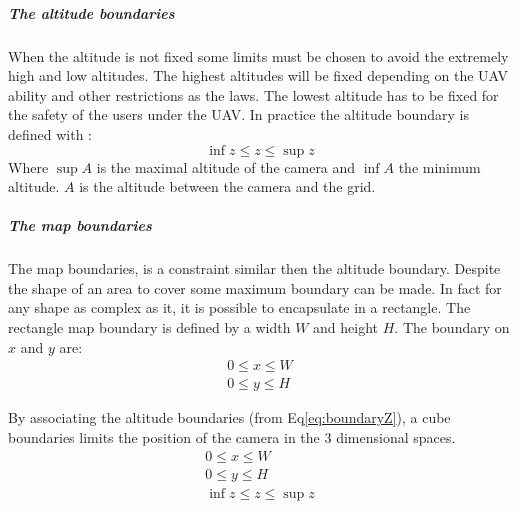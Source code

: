 \subparagraph{The altitude boundaries}\label{sec:altitudeBoundary}
 When the altitude is not fixed some limits must be chosen to avoid the extremely high and low altitudes. The highest altitudes will be fixed depending on the UAV ability and other restrictions as the laws. The lowest altitude has to be fixed for the safety of the users under the UAV.  
In practice the  altitude boundary is defined with :
 \begin{equation}\label{eq:boundaryZ}
   \inf z\leq z\leq \sup z  
 \end{equation} 
 Where $\sup A$ is the maximal altitude of the camera and $\inf A$ the minimum altitude. $A$ is the altitude between the camera and the grid. %
 
 \subparagraph{The map boundaries} \label{sec:MapBoundaries}
The map boundaries, is a constraint similar then the altitude boundary. Despite the shape of an area to cover some maximum boundary can be made. In fact for any shape as complex as it, it is  possible to encapsulate in a rectangle. The rectangle map boundary is defined by a width $W$ and height $H$. The boundary on $x$ and $y$ are:
 \begin{equation}
  \begin{array}{lcl}
  	0\leq x\leq W \\
  	 0\leq y\leq H 
  \end{array} 
 \end{equation}  
 
By associating the altitude boundaries (from Eq\ref{eq:boundaryZ}), a cube boundaries limits the position of the camera in the 3 dimensional spaces. 
\begin{equation}\label{eq:3dBoundary}
  \begin{array}{lclcl}
  	0\leq x\leq W \\ 0\leq y\leq H  \\ \inf z\leq z\leq \sup z  
  \end{array} 
 \end{equation} 
 

